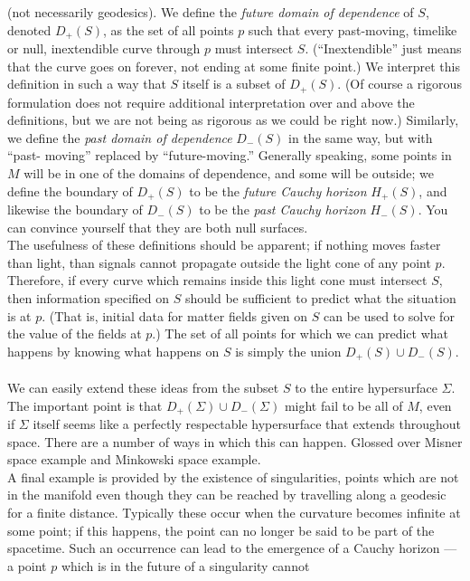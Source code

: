  
 (not necessarily geodesics). We define the \emph{future domain of dependence} of $S$, denoted
 $D_+ (S)$, as the set of all points $p$ such that every past-moving, timelike or null, inextendible
 curve through $p$ must intersect $S$. (“Inextendible” just means that the curve goes on forever,
 not ending at some finite point.) We interpret this definition in such a way that $S$ itself is a
 subset of $D_+ (S)$. (Of course a rigorous formulation does not require additional interpretation
 over and above the definitions, but we are not being as rigorous as we could be right now.)
 Similarly, we define the \emph{past domain of dependence} $D_− (S)$ in the same way, but with “past-
 moving” replaced by “future-moving.” Generally speaking, some points in $M$ will be in one
 of the domains of dependence, and some will be outside; we define the boundary of $D_+ (S)$
 to be the \emph{future Cauchy horizon} $H_+ (S)$, and likewise the boundary of $D_− (S)$ to be the
 \emph{past Cauchy horizon} $H_− (S)$. You can convince yourself that they are both null surfaces.
 \\
 The usefulness of these definitions should be apparent; if nothing moves faster than light,
 than signals cannot propagate outside the light cone of any point $p$. Therefore, if every
 curve which remains inside this light cone must intersect $S$, then information specified on $S$
 should be sufficient to predict what the situation is at $p$. (That is, initial data for matter
 fields given on $S$ can be used to solve for the value of the fields at $p$.) The set of all points
 for which we can predict what happens by knowing what happens on $S$ is simply the union
 $D_+ (S) \cup D_− (S)$.\\
 \\
 We can easily extend these ideas from the subset $S$ to the entire hypersurface $Σ$. The
 important point is that $D_+ (Σ) \cup D_− (Σ)$ might fail to be all of $M$, even if $Σ$ itself seems like
 a perfectly respectable hypersurface that extends throughout space. There are a number
 of ways in which this can happen.
 Glossed over Misner space example and Minkowski space example.
 \\
 A final example is provided by the existence of singularities, points which are not in the
 manifold even though they can be reached by travelling along a geodesic for a finite distance.
 Typically these occur when the curvature becomes infinite at some point; if this happens,
 the point can no longer be said to be part of the spacetime. Such an occurrence can lead to
 the emergence of a Cauchy horizon — a point $p$ which is in the future of a singularity cannot
